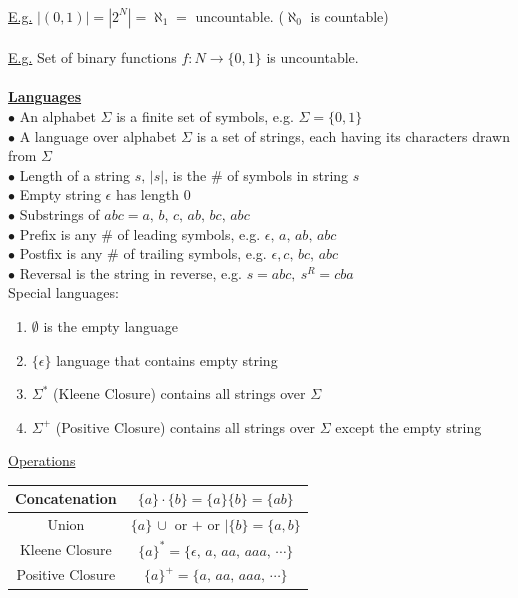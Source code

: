 \documentclass[8pt,letterpaper,twocolumn]{article}
\begin{document}
\\
\underline{E.g.} $\left| (0,1) \right| = \left| 2^N \right| = \aleph_1 = $ uncountable.
($\aleph_0$ is countable)\\
\\
\underline{E.g.} Set of binary functions $f:N \rightarrow \{0,1\}$ is uncountable.\\
\\
\underline{\textbf{Languages}}\\
$\bullet$ An alphabet $\Sigma$ is a finite set of symbols, e.g. $\Sigma = \{0,1\}$\\
$\bullet$ A language over alphabet $\Sigma$ is a set of strings,
each having its characters drawn from $\Sigma$\\
$\bullet$ Length of a string $s,\, |s|$, is the \# of symbols in string $s$\\
$\bullet$ Empty string $\epsilon$ has length 0\\
$\bullet$ Substrings of $abc = a,\, b,\, c,\, ab,\, bc,\, abc$\\
$\bullet$ Prefix is any \# of leading symbols, e.g. $\epsilon,\, a,\, ab,\, abc$\\
$\bullet$ Postfix is any \# of trailing symbols, e.g. $\epsilon, c,\, bc,\, abc$\\
$\bullet$ Reversal is the string in reverse, e.g. $s = abc, \: s^R = cba$\\
Special languages:
\begin{enumerate}
\item $\emptyset$ is the empty language
\item $\{\epsilon\}$ language that contains empty string
\item $\Sigma^*$ (Kleene Closure) contains all strings over $\Sigma$
\item $\Sigma^+$ (Positive Closure) contains all strings over $\Sigma$ except the empty string
\end{enumerate}
\underline{Operations}
\begin{tabular}{|c|c|}
\hline 
Concatenation & $\{a\} \cdot \{b\} = \{a\}\{b\} = \{ab\}$ \\ 
\hline 
Union & $\{a\}\, \cup$ or $+$ or $\mid \{b\} = \{a,b\}$ \\ 
\hline
Kleene Closure & $\{a\}^* = \{\epsilon,\, a,\, aa,\, aaa,\, \cdots\}$ \\ 
\hline
Positive Closure & $\{a\}^+ = \{a,\, aa,\, aaa,\, \cdots\}$ \\
\hline
\end{tabular}
\end{document}
